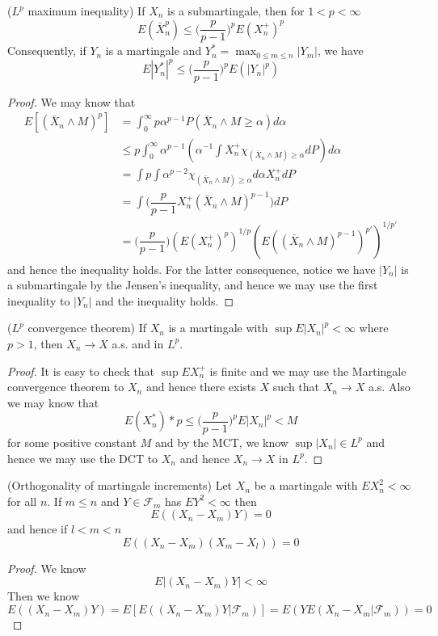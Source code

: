 \documentclass[lang=en, color=blue, ]{elegantbook}
\newcommand{\F}{\mathcal{F}}
\begin{document}
\begin{theorem}
    ($L^p$ maximum inequality) If $X_n$ is a submartingale, then for $1< p < \infty$
    \[E(\bar{X}_n^p) \leq \Big(\dfrac{p}{p-1}\Big)^p E(X_n^+)^p\]
    Consequently, if $Y_n$ is a martingale and $Y_n^* = \max_{0\leq m \leq n} |Y_m|$, we have
    \[E|Y_n^*|^p \leq \Big(\dfrac{p}{p-1}\Big)^p E(|Y_n|^p)\]
\end{theorem}
\begin{proof}
    We may know that
    \[
    \begin{aligned}
    E[(\bar{X}_n\wedge M)^p] &= \int_0^{\infty} p\alpha^{p-1}P(\bar{X}_n\wedge M \geq \alpha)d\alpha     \\
    &\leq p\int_0^{\infty} \alpha^{p-1}(\alpha^{-1}\int X_n^+\chi_{(\bar{X}_n\wedge M)\geq \alpha}dP)d\alpha \\
    & = \int p\int\alpha^{p-2}\chi_{(\bar{X}_n\wedge M) \geq \alpha} d\alpha X_n^+ dP \\
    & = \int\Big(\dfrac{p}{p-1}X_n^+(\bar{X}_n\wedge M)^{p-1}\Big)dP \\
    &= \Big(\dfrac{p}{p-1}\Big)(E(X_n^+)^p)^{1/p}(E((\bar{X}_n\wedge M)^{p-1})^{p'})^{1/p'}
    \end{aligned}
    \]
    and hence the inequality holds. For the latter consequence, notice we have $|Y_n|$ is a submartingale by the Jensen's inequality, and hence we may use the first inequality to $|Y_n|$ and the inequality holds.
\end{proof}

\begin{theorem}
    ($L^p$ convergence theorem) If $X_n$ is a martingale with $\sup E|X_n|^p < \infty$ where $p > 1$, then $X_n \to X$ a.s. and in $L^p$.
\end{theorem}
\begin{proof}
    It is easy to check that $\sup EX_n^+$ is finite and we may use the Martingale convergence theorem to $X_n$ and hence there exists $X$ such  that $X_n \to X$ a.s. Also we may know that
    \[E(X_n^*)*p \leq \Big(\dfrac{p}{p-1}\Big)^p E|X_n|^p < M\]
    for some positive constant $M$ and by the MCT, we know $\sup |X_n| \in L^p$ and hence we may use the DCT to $X_n$ and hence $X_n \to X$ in $L^p$.
\end{proof}

\begin{theorem}
    (Orthogonality of martingale increments) Let $X_n$ be a martingale with $EX_n^2 < \infty$ for all $n$. If $m\leq n$ and $Y\in\F_m$ has $EY^2 < \infty$ then
    \[E((X_n-X_m)Y) = 0\]
    and hence if $l<m<n$
    \[E((X_n-X_m)(X_m-X_l)) = 0\] 
\end{theorem}
\begin{proof}
    We know
    \[E|(X_n-X_m)Y| < \infty\]
    Then we know
    \[
    E((X_n-X_m)Y) = E[E((X_n-X_m)Y|\F_m)] = E(YE(X_n-X_m|\F_m)) = 0
    \]
\end{proof}
\end{document}
